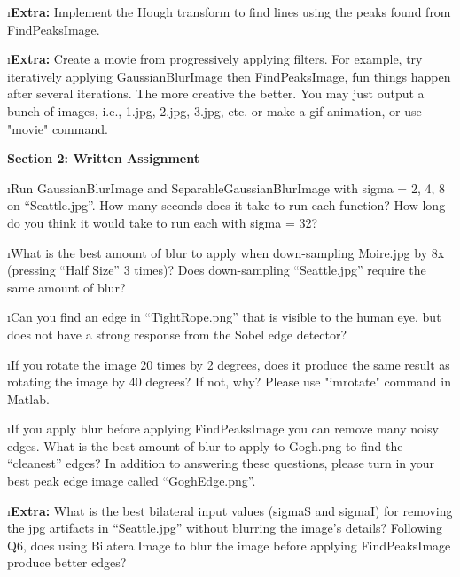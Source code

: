\documentclass[fleqn]{article}
\begin{document}
\i {\bf Extra:} Implement the Hough transform to find lines using the peaks found from FindPeaksImage.
 
\i {\bf Extra:} Create a movie from progressively applying filters. For example, try iteratively applying GaussianBlurImage then FindPeaksImage, fun things happen after several iterations. The more creative the better. You may just output a bunch of images, i.e., 1.jpg, 2.jpg, 3.jpg, etc. or make a gif animation, or use "movie" command.

\ene

{\bf Section 2: Written Assignment} 

\bee
\i Run GaussianBlurImage and SeparableGaussianBlurImage with sigma = 2, 4, 8 on “Seattle.jpg”. How many seconds does it take to run each function? How long do you think it would take to run each with sigma = 32?


\i What is the best amount of blur to apply when down-sampling Moire.jpg by 8x (pressing “Half Size” 3 times)? Does down-sampling “Seattle.jpg” require the same amount of blur?

\i Can you find an edge in “TightRope.png” that is visible to the human eye, but does not have a strong response from the Sobel edge detector?

\i If you rotate the image 20 times by 2 degrees, does it produce the same result as rotating the image by 40 degrees? If not, why? Please use "imrotate" command in Matlab.

\i If you apply blur before applying FindPeaksImage you can remove many noisy edges. What is the best amount of blur to apply to Gogh.png to find the “cleanest” edges? In addition to answering these questions, please turn in your best peak edge image called “GoghEdge.png”.

\i {\bf Extra:} What is the best bilateral input values (sigmaS and sigmaI) for removing the jpg artifacts in “Seattle.jpg” without blurring the image’s details? Following Q6, does using BilateralImage to blur the image before applying FindPeaksImage produce better edges?

\ene
\end{document}
